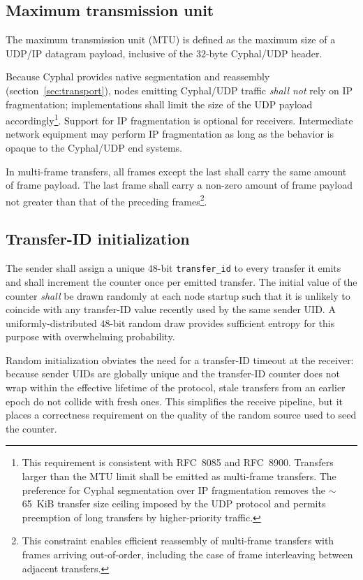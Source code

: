 \subsection{Maximum transmission unit}\label{sec:transport_udp_mtu}

The maximum transmission unit (MTU) is defined as the maximum size of a UDP/IP datagram payload,
inclusive of the $32$-byte Cyphal/UDP header.

Because Cyphal provides native segmentation and reassembly (section~\ref{sec:transport}),
nodes emitting Cyphal/UDP traffic \emph{shall not} rely on IP fragmentation;
implementations shall limit the size of the UDP payload accordingly\footnote{%
    This requirement is consistent with RFC~8085 and RFC~8900. Transfers larger than the MTU limit shall
    be emitted as multi-frame transfers. The preference for Cyphal segmentation over IP fragmentation
    removes the $\sim$65~KiB transfer size ceiling imposed by the UDP protocol and permits preemption of
    long transfers by higher-priority traffic.
}.
Support for IP fragmentation is optional for receivers.
Intermediate network equipment may perform IP fragmentation as long as the behavior is opaque to the
Cyphal/UDP end systems.

In multi-frame transfers, all frames except the last shall carry the same amount of frame payload.
The last frame shall carry a non-zero amount of frame payload not greater than that of the preceding
frames\footnote{%
    This constraint enables efficient reassembly of multi-frame transfers with frames arriving
    out-of-order, including the case of frame interleaving between adjacent transfers.
}.

\subsection{Transfer-ID initialization}\label{sec:transport_udp_transfer_id}

The sender shall assign a unique $48$-bit \texttt{transfer\_id} to every transfer it emits and shall
increment the counter once per emitted transfer.
The initial value of the counter \emph{shall} be drawn randomly at each node startup such that it is
unlikely to coincide with any transfer-ID value recently used by the same sender UID.
A uniformly-distributed $48$-bit random draw provides sufficient entropy for this purpose with
overwhelming probability.

Random initialization obviates the need for a transfer-ID timeout at the receiver: because sender UIDs
are globally unique and the transfer-ID counter does not wrap within the effective lifetime of the
protocol, stale transfers from an earlier epoch do not collide with fresh ones.
This simplifies the receive pipeline, but it places a correctness requirement on the quality of the
random source used to seed the counter.

